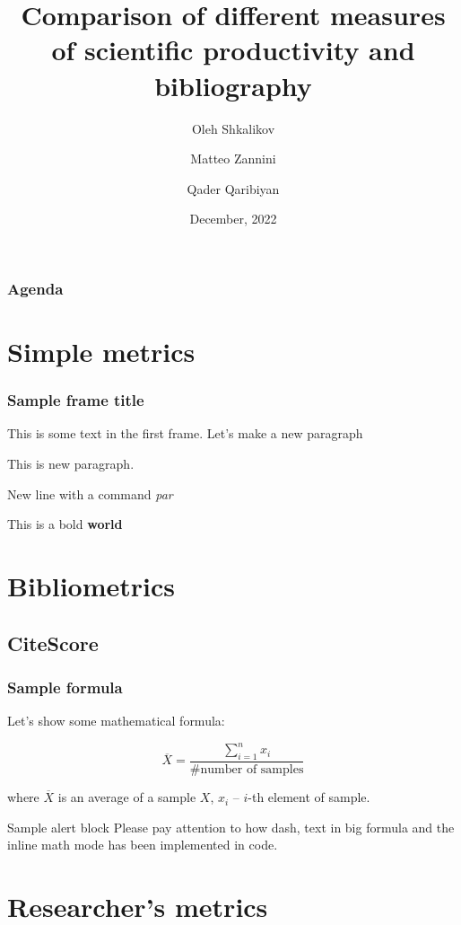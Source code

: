 \documentclass{beamer}
\title[Scientific metrics]{Comparison of different measures of scientific productivity and bibliography}
\author[O. Shkalikov \and M. Zannini \and Q.Qaribiyan]
{Oleh Shkalikov \and Matteo Zannini \and Qader Qaribiyan}
\institute[]{TU Dresden, Computer Science Faculty}
\date{December, 2022}
\begin{document}
\frame{\titlepage}

\begin{frame}
    \frametitle{Agenda}
    \tableofcontents
\end{frame}

\section{Simple metrics}

\begin{frame}
    \frametitle{Sample frame title}
    This is some text in the first frame. Let's make a new paragraph

    This is new paragraph. \par New line with a command \textit{par}

    This is a bold \textbf{world}

\end{frame}

\section{Bibliometrics}

\subsection{CiteScore}

\begin{frame}
    \frametitle{Sample formula}
    Let's show some mathematical formula:

    \[
        \overline{X} = \frac{\sum\limits_{i=1}^n x_i}{\# \text{number of samples}}
    \]

    where \(\overline{X}\) is an average of a sample \(X\),
    $x_i$ -- $i$-th element of sample.

    \begin{alertblock}{Sample alert block}
        Please pay attention to how dash, text in big formula and  the inline math mode
        has been implemented in code.
    \end{alertblock}
\end{frame}

\section{Researcher's metrics}
\end{document}
